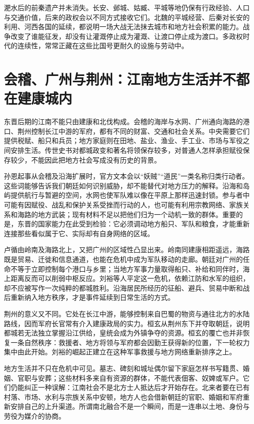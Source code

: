 淝水后的前秦遗产并未消失。长安、邺城、姑臧、平城等地仍保有行政经验、人口与交通价值，后来的政权会以不同方式接收它们。北魏的平城经营、后秦对长安的利用、河西各国的延续，都说明一场大战无法抹去城市和地方社会积累的能力。战争改变了谁能征发，却没有让灌溉停止成为灌溉、让渡口停止成为渡口。多政权时代的连续性，常常正藏在这些比国号更耐久的设施与劳动中。

\section{会稽、广州与荆州：江南地方生活并不都在建康城内}
\label{sec:eastern-jin-depth-southern-local}

东晋后期的江南不能只由建康和北伐构成。会稽的海岸与水网、广州通向海路的港口、荆州控制长江中游的军府，都有不同的财富、交通和社会关系。中央需要它们提供税赋、船只和兵员；地方家庭则在田地、盐业、渔业、手工业、市场与军役之间安排生活。传世史书对都城政变和著名将领保存较多，对普通人怎样承担赋役保存较少，不能因此把地方社会写成没有历史的背景。

孙恩起事从会稽及沿海扩展时，官方文本会以“妖贼”“道民”一类名称归类行动者。这些词能够告诉我们朝廷如何识别威胁，却不能替代对地方压力的解释。沿海和岛屿提供航行与暂避的空间，水网也使军队难以像在平原上那样迅速封锁。参与者中可能有因赋役、战乱和保护关系受挫而行动的人，也可能有利用宗教网络、家族关系和海路的地方武装；现有材料不足以把他们归为一个动机一致的群体。重要的是，东晋的国家能力在此受到检验：它必须调动地方船只、军队和粮食，才能重新连接那些看似属于它、实际却有自身网络的区域。

卢循由岭南及海路北上，又把广州的区域性凸显出来。岭南同建康相距遥远，海路既是贸易、迁徙和信息通道，也能在危机中成为军队移动的走廊。朝廷对广州的任命不等于立即控制每个港口与乡里；当地方军事力量取得船只、补给和同伴时，海上距离反而可以削弱中枢反应。刘裕等人平定这一危机，依赖江防和水军的组织，却不应被写作一次纯粹的都城胜利。沿海居民所经历的征船、避兵、贸易中断和战后重新纳入地方秩序，才是事件延续到日常生活的方式。

荆州的意义又不同。它处在长江中游，能够控制来自巴蜀的物资与通往北方的水陆路线，因而军府长官常有介入建康政局的实力。桓玄从荆州东下并夺取朝廷，说明都城若无法独立掌握沿江供给，皇统会成为外镇争夺的资源。桓玄的覆亡也并非恢复一条自然秩序：救援者、地方将领与军府都会因勤王获得新的位置，下一轮权力集中由此开始。刘裕的崛起正建立在这种军事救援与地方网络重新排序之上。

地方生活并不只在危机中可见。墓志、碑刻和城址偶尔留下家庭怎样书写籍贯、婚姻、官职与安葬；这些材料多来自有资源的群体，不能代表佃客、奴婢或军户。它们仍能纠正一种误解：江南社会不是北方士人抵达后才开始存在。北来者要在已有村落、市场、水利与宗族关系中安顿，地方人也会借新朝廷的官职、婚姻和军府重新安排自己的上升渠道。所谓南北融合不是一个瞬间，而是一连串以土地、身份与劳役为媒介的协商。

